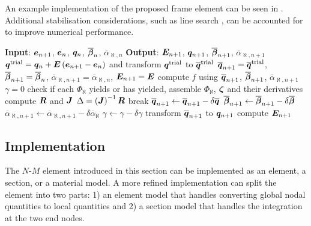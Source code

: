 An example implementation of the proposed frame element can be seen in .
Additional stabilisation considerations, such as line search \cite{Dutko1993}, can be accounted for to improve numerical performance.
\begin{breakablealgorithm}
\caption{state determination of the proposed frame element}\label{algo:beam_model}
\begin{algorithmic}
\State \textbf{Input}: $\bm{e}_{n+1}$, $\bm{e}_n$, $\bm{q}_n$, $\overline{\bm{\beta}}_n$, $\overline{\alpha}_{\aleph,n}$
\State \textbf{Output}: $\bm{E}_{n+1}$, $\bm{q}_{n+1}$, $\overline{\bm{\beta}}_{n+1}$, $\overline{\alpha}_{\aleph,n+1}$
\State $\bm{q}^\text{trial}=\bm{q}_n+\bm{E}\left(\bm{e}_{n+1}-\bm{e}_n\right)$ and transform $\bm{q}^\text{trial}$ to $\overline{\bm{q}}^\text{trial}$
\State $\overline{\bm{q}}_{n+1}=\overline{\bm{q}}^\text{trial}$, $\overline{\bm{\beta}}_{n+1}=\overline{\bm{\beta}}_n$, $\overline{\alpha}_{\aleph,n+1}=\overline{\alpha}_{\aleph,n}$, $\bm{E}_{n+1}=\bm{E}$
\State compute $f$ using $\overline{\bm{q}}_{n+1}$, $\overline{\bm{\beta}}_{n+1}$, $\overline{\alpha}_{\aleph,n+1}$
\State $\gamma=0$
\State check if each $\Phi_\aleph$ yields or has yielded, assemble $\Phi_\aleph$, $\bm{\zeta}$ and their derivatives
\State compute $\bm{R}$ and $\bm{J}$
\State $\Delta=\left(\bm{J}\right)^{-1}\bm{R}$
\State break
\EndIf
\State $\overline{\bm{q}}_{n+1}\leftarrow\overline{\bm{q}}_{n+1}-\delta\overline{\bm{q}}$
\State $\overline{\bm{\beta}}_{n+1}\leftarrow\overline{\bm{\beta}}_{n+1}-\delta\overline{\bm{\beta}}$
\State $\overline{\alpha}_{\aleph,n+1}\leftarrow\overline{\alpha}_{\aleph,n+1}-\delta\overline{\alpha}_{\aleph}$
\State $\gamma\leftarrow\gamma-\delta\gamma$
\EndWhile
\State transform $\overline{\bm{q}}_{n+1}$ to $\bm{q}_{n+1}$
\State compute $\bm{E}_{n+1}$
\EndIf
\end{algorithmic}
\end{breakablealgorithm}
\subsection{Implementation}
The $N$-$M$ element introduced in this section can be implemented as an element, a section, or a material model.
A more refined implementation can split the element into two parts: 1) an element model that handles converting global nodal quantities to local quantities  and 2) a section model that handles the integration at the two end nodes.
